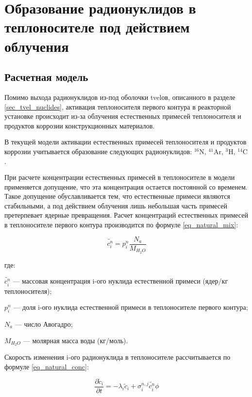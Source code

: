 \section{Образование радионуклидов в теплоносителе под действием облучения}

\subsection{Расчетная модель}

Помимо выхода радионуклидов из-под оболочки \ac{tvel}ов, описанного в разделе \ref{sec_tvel_nuclides}, активация 
теплоносителя первого контура в реакторной установке происходит из-за облучения естественных примесей теплоносителя и 
продуктов коррозии конструкционных материалов. 

В текущей модели активации естественных примесей теплоносителя и продуктов коррозии учитывается образование следующих 
радионуклидов: $^{16}\text{N}$, $^{41}\text{Ar}$, $^{3}\text{H}$, $^{14}\text{C}$.

При расчете концентрации естественных примесей в теплоносителе в модели применяется допущение, что эта концентрация 
остается постоянной со временем. Такое допущение обуславливается тем, что естественные примеси являются стабильными, а 
под действием облучения лишь небольшая часть примесей претерпевает ядерные превращения. Расчет концентраций естественных 
примесей в теплоносителе первого контура производится по формуле \ref{eq_natural_mix}:

\begin{equation}
    \label{eq_natural_mix}
    \widetilde{c_{i}^{n}} = p_{i}^{n} \frac{N_{a}}{M_{H_{2}O}}
\end{equation}

где:
\begin{description}
    \item $\widetilde{c_{i}^{n}}$ --- массовая концентрация i-ого нуклида естественной примеси (ядер/кг теплоносителя);
    \item $p_{i}^{n}$ --- доля i-ого нуклида естественной примеси в теплоносителе первого контура;
    \item $N_{a}$ --- число Авогадро;
    \item $M_{H_{2}O}$ --- молярная масса воды (кг/моль).
\end{description}

Скорость изменения i-ого радионуклида в теплоносителе рассчитывается по формуле \ref{eq_natural_conc}:

\begin{equation}
    \label{eq_natural_conc}
    \frac{\partial \widetilde{c}_{i}}{\partial t} = -\lambda_{i}\widetilde{c}_{i} + \sigma_{i}^{n,j} \widetilde{c_{i}^{n}}
        \phi 
\end{equation}

